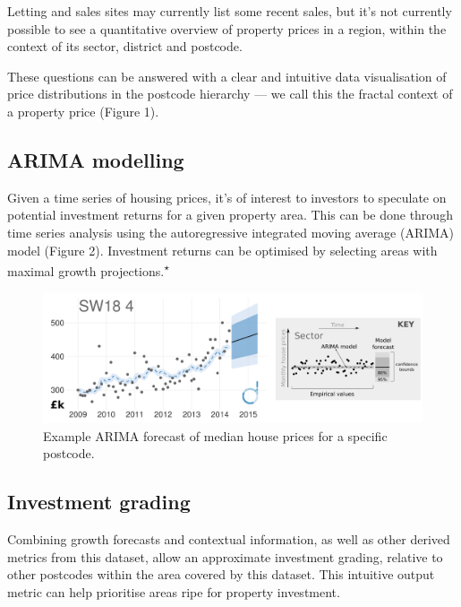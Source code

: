 \documentclass[
10pt, %
a4paper, %
oneside, %
headinclude,footinclude, %
BCOR5mm, %
]{scrartcl}
\begin{document}
Letting and sales sites may currently list some recent sales, but it's
not currently possible to see a quantitative overview of property
prices in a region, within the context of its sector, district and
postcode.

These questions can be answered with a clear and intuitive data
visualisation of price distributions in the postcode hierarchy --- we
call this the fractal context of a property price (Figure 1).

\subsection{ARIMA modelling}

Given a time series of housing prices, it's of interest to investors
to speculate on potential investment returns for a given property
area. This can be done through time series analysis using the
autoregressive integrated moving average (ARIMA) model (Figure
2). Investment returns can be optimised by selecting areas with
maximal growth projections.\textsuperscript{$\star$} \\

\begin{figure}[h]
\begin{center}
\includegraphics[width=.9\textwidth]{Figures/arima.pdf}
\caption{Example ARIMA forecast of median house prices for a specific postcode.}
\end{center}
\end{figure}

\vspace{-2em}
\subsection{Investment grading}

Combining growth forecasts and contextual information, as well as
other derived metrics from this dataset, allow an approximate
investment grading, relative to other postcodes within the area
covered by this dataset. This intuitive output metric can help
prioritise areas ripe for property investment. \\
\end{document}
